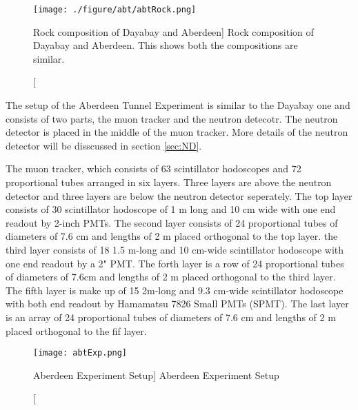 \begin{figure}
    \label{fig:abtRock.png}
    \centering
    \texttt{[image: ./figure/abt/abtRock.png]}
    \caption
    [Rock composition of Dayabay and Aberdeen]
    {Rock composition of Dayabay and Aberdeen. This shows both the compositions are similar.}
    \end{figure}


The setup of the Aberdeen Tunnel Experiment is similar to the Dayabay one and consists of
two parts, the muon tracker and the neutron detecotr. The neutron detector is placed in the
middle of the muon tracker.
More details of the neutron detector will be disscussed in section \ref{sec:ND}.

The muon tracker, which consists of 63 scintillator hodoscopes and 72 proportional
tubes arranged in six layers.
Three layers are above the neutron detector and three layers are below the neutron detector seperately.
The top layer consists of 30 scintillator hodoscope of 1 m long and 10 cm wide with
one end readout by 2-inch PMTs. The second layer consists of 24 proportional tubes of diameters of
7.6 cm and lengths of 2 m placed orthogonal to the top layer. the third layer consists of 18 1.5 m-long
and 10 cm-wide scintillator hodoscope with one end readout by a 2" PMT. The forth layer is a row
of 24 proportional tubes of diameters of 7.6cm and lengths of 2 m placed orthogonal to the third layer.
The fifth layer is make up of 15 2m-long and 9.3 cm-wide scintillator hodoscope with both end
readout by Hamamatsu 7826 Small PMTs (SPMT). The last layer is an array of 24 proportional tubes
of diameters of 7.6 cm and lengths of 2 m placed  orthogonal to the fif layer.




\begin{figure}
    \label{fig:abtExp.png}
    \centering
    \texttt{[image: abtExp.png]}
    \caption
    [Aberdeen Experiment Setup]
    {Aberdeen Experiment Setup}
    \end{figure}



